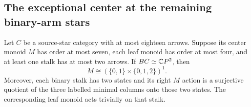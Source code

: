 \subsection{The exceptional center at the remaining binary-arm stars}

\begin{proposition}
\label{CP2:A-star-binary-arm-band-center}
Let $C$ be a source-star category with at most eighteen
arrows.  Suppose its center monoid $M$ has order at most
seven, each leaf monoid has order at most four, and at
least one stalk has at most two arrows.  If
$BC\simeq\mathbb{C}P^2$, then
\[
 M\cong (\{0,1\}\times\{0,1,2\})^1.
\]
Moreover, each binary stalk has two states and its right
$M$ action is a surjective quotient of the three labelled
minimal columns onto those two states.  The corresponding
leaf monoid acts trivially on that stalk.
\end{proposition}
